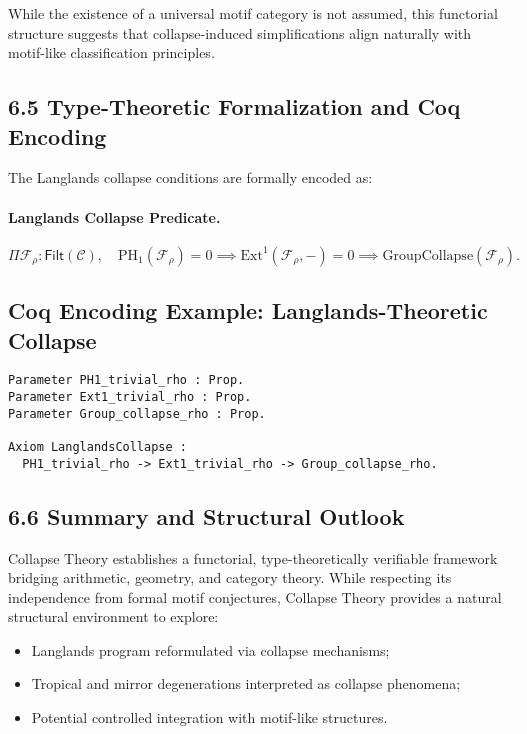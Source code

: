 \documentclass[11pt]{article}
\begin{document}
While the existence of a universal motif category is not assumed, this functorial structure suggests that collapse-induced simplifications align naturally with motif-like classification principles.

\subsection*{6.5 Type-Theoretic Formalization and Coq Encoding}

The Langlands collapse conditions are formally encoded as:

\paragraph{Langlands Collapse Predicate.}
\[
\Pi \mathcal{F}_\rho : \mathsf{Filt}(\mathcal{C}), \quad \mathrm{PH}_1(\mathcal{F}_\rho) = 0 \implies \mathrm{Ext}^1(\mathcal{F}_\rho, -) = 0 \implies \mathrm{GroupCollapse}(\mathcal{F}_\rho).
\]

\subsection*{Coq Encoding Example: Langlands-Theoretic Collapse}

\begin{lstlisting}[language=Coq, caption=Langlands-Theoretic Collapse Formalization, captionpos=b]
Parameter PH1_trivial_rho : Prop.
Parameter Ext1_trivial_rho : Prop.
Parameter Group_collapse_rho : Prop.

Axiom LanglandsCollapse :
  PH1_trivial_rho -> Ext1_trivial_rho -> Group_collapse_rho.
\end{lstlisting}

\subsection*{6.6 Summary and Structural Outlook}

Collapse Theory establishes a functorial, type-theoretically verifiable framework bridging arithmetic, geometry, and category theory. While respecting its independence from formal motif conjectures, Collapse Theory provides a natural structural environment to explore:

\begin{itemize}
    \item Langlands program reformulated via collapse mechanisms;
    \item Tropical and mirror degenerations interpreted as collapse phenomena;
    \item Potential controlled integration with motif-like structures.
\end{itemize}
\end{document}
